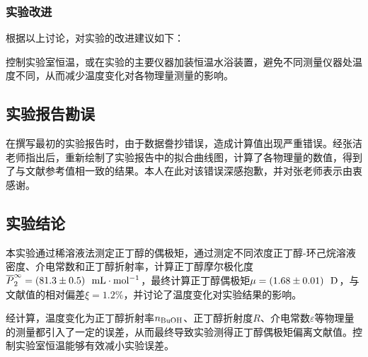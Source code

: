 \documentclass[12pt]{article}
\begin{document}
 		\subsubsection{实验改进}
 		根据以上讨论，对实验的改进建议如下：\par 
 		控制实验室恒温，或在实验的主要仪器加装恒温水浴装置，避免不同测量仪器处温度不同，从而减少温度变化对各物理量测量的影响。
 		\subsection{实验报告勘误}
 		在撰写最初的实验报告时，由于数据誊抄错误，造成计算值出现严重错误。经张洁老师指出后，重新绘制了实验报告中的拟合曲线图，计算了各物理量的数值，得到了与文献参考值相一致的结果。本人在此对该错误深感抱歉，并对张老师表示由衷感谢。
 	 \subsection{实验结论}
 	 本实验通过稀溶液法测定正丁醇的偶极矩，通过测定不同浓度正丁醇-环己烷溶液密度、介电常数和正丁醇折射率，计算正丁醇摩尔极化度$\overline{P}^{\infty}_{2}=(81.3\pm 0.5)\ \ {\rm mL\cdot mol^{-1}}$，最终计算正丁醇偶极矩$\mu=(1.68\pm 0.01)\ \ {\rm D}$，与文献值的相对偏差$\xi=1.2\%$，并讨论了温度变化对实验结果的影响。\par 
 	 经计算，温度变化为正丁醇折射率$n_{\rm BuOH}$、正丁醇折射度$R$、介电常数$\varepsilon$等物理量的测量都引入了一定的误差，从而最终导致实验测得正丁醇偶极矩偏离文献值。控制实验室恒温能够有效减小实验误差。\par 
 	 


 

   

\vbox{}



\end{document}
